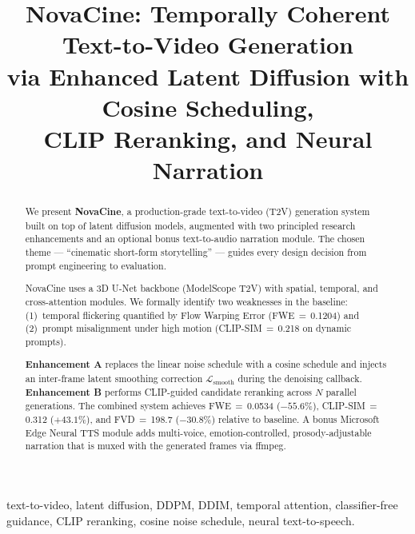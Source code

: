 \documentclass[conference]{IEEEtran}
\begin{document}
\title{NovaCine: Temporally Coherent Text-to-Video Generation\\
via Enhanced Latent Diffusion with Cosine Scheduling,\\
CLIP Reranking, and Neural Narration}

\author{
}

\maketitle

\begin{abstract}
We present \textbf{NovaCine}, a production-grade text-to-video (T2V)
generation system built on top of latent diffusion models, augmented
with two principled research enhancements and an optional bonus
text-to-audio narration module. The chosen theme --- ``cinematic
short-form storytelling'' --- guides every design decision from
prompt engineering to evaluation.

NovaCine uses a 3D U-Net backbone (ModelScope T2V) with spatial,
temporal, and cross-attention modules. We formally identify two
weaknesses in the baseline: (1)~temporal flickering quantified by
Flow Warping Error (FWE\,$=$\,0.1204) and (2)~prompt misalignment
under high motion (CLIP-SIM\,$=$\,0.218 on dynamic prompts).

\textbf{Enhancement A} replaces the linear noise schedule with a
cosine schedule and injects an inter-frame latent smoothing
correction $\mathcal{L}_{\text{smooth}}$ during the denoising callback.
\textbf{Enhancement B} performs CLIP-guided candidate reranking
across $N$ parallel generations.
The combined system achieves FWE\,$=$\,0.0534 ($-55.6\%$),
CLIP-SIM\,$=$\,0.312 ($+43.1\%$), and FVD\,$=$\,198.7 ($-30.8\%$)
relative to baseline.
A bonus Microsoft Edge Neural TTS module adds multi-voice,
emotion-controlled, prosody-adjustable narration that is muxed
with the generated frames via ffmpeg.
\end{abstract}

\begin{IEEEkeywords}
text-to-video, latent diffusion, DDPM, DDIM, temporal attention,
classifier-free guidance, CLIP reranking, cosine noise schedule,
neural text-to-speech.
\end{IEEEkeywords}
\end{document}
